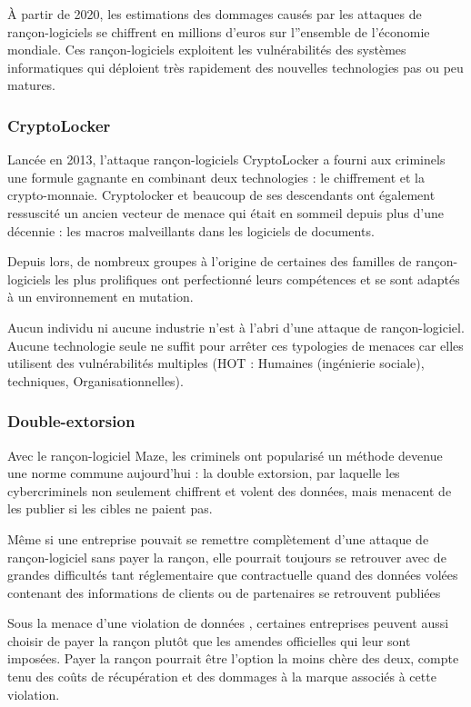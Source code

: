 À partir de 2020, les estimations des dommages causés par les attaques de rançon-logiciels se chiffrent en millions d'euros sur l''ensemble de l'économie mondiale. Ces rançon-logiciels exploitent les vulnérabilités des systèmes informatiques qui déploient très rapidement des 
 nouvelles technologies pas ou peu matures.

\subsubsection{CryptoLocker}
Lancée en 2013, l'attaque rançon-logiciels CryptoLocker a fourni aux criminels une formule gagnante en combinant deux technologies : le chiffrement et la crypto-monnaie. Cryptolocker et beaucoup de ses descendants ont également ressuscité un ancien vecteur de menace qui était en sommeil depuis plus d'une décennie : les macros malveillants dans les logiciels de documents.

Depuis lors, de nombreux groupes à l'origine de certaines des familles de rançon-logiciels les plus prolifiques ont perfectionné leurs compétences et se sont adaptés à un environnement en mutation.

Aucun individu ni aucune industrie n'est à l'abri d'une attaque de rançon-logiciel. Aucune technologie seule ne suffit pour arrêter ces typologies de menaces car elles utilisent des vulnérabilités multiples (HOT : Humaines (ingénierie sociale), techniques, Organisationnelles). 

\subsubsection{Double-extorsion}

Avec le rançon-logiciel Maze, les criminels ont popularisé un méthode devenue une norme commune aujourd'hui : la double extorsion, par laquelle les cybercriminels non seulement chiffrent et volent des données, mais menacent de les publier si les cibles ne paient pas.

Même si une entreprise pouvait se remettre complètement d'une attaque de rançon-logiciel sans payer la rançon, elle pourrait toujours se retrouver avec de grandes difficultés tant réglementaire que contractuelle quand des données volées contenant des informations de clients ou de partenaires se retrouvent  publiées

Sous la menace d'une violation de données , certaines entreprises peuvent aussi choisir de payer la rançon plutôt que les amendes officielles qui leur sont imposées. Payer la rançon pourrait être l'option la moins chère des deux, compte tenu des coûts de récupération et des dommages à la marque associés à cette violation. 

